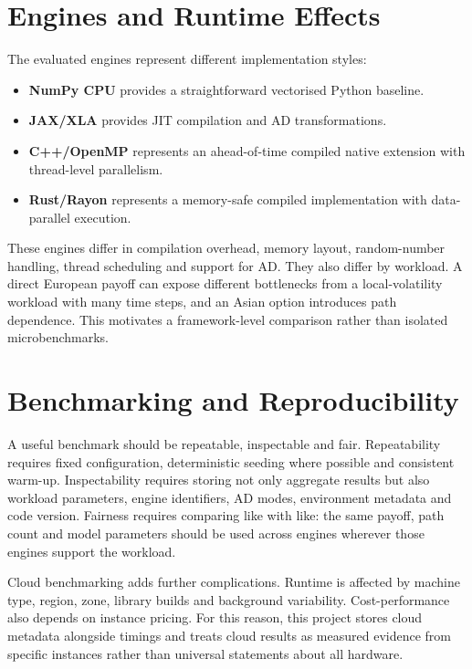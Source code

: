 \section{Engines and Runtime Effects}

The evaluated engines represent different implementation styles:
\begin{itemize}
    \item \textbf{NumPy CPU} provides a straightforward vectorised Python baseline.
    \item \textbf{JAX/XLA} provides JIT compilation and AD transformations.
    \item \textbf{C++/OpenMP} represents an ahead-of-time compiled native extension with thread-level parallelism.
    \item \textbf{Rust/Rayon} represents a memory-safe compiled implementation with data-parallel execution.
\end{itemize}

These engines differ in compilation overhead, memory layout, random-number handling, thread scheduling and support for AD. They also differ by workload. A direct European payoff can expose different bottlenecks from a local-volatility workload with many time steps, and an Asian option introduces path dependence. This motivates a framework-level comparison rather than isolated microbenchmarks.

\section{Benchmarking and Reproducibility}

A useful benchmark should be repeatable, inspectable and fair. Repeatability requires fixed configuration, deterministic seeding where possible and consistent warm-up. Inspectability requires storing not only aggregate results but also workload parameters, engine identifiers, AD modes, environment metadata and code version. Fairness requires comparing like with like: the same payoff, path count and model parameters should be used across engines wherever those engines support the workload.

Cloud benchmarking adds further complications. Runtime is affected by machine type, region, zone, library builds and background variability. Cost-performance also depends on instance pricing. For this reason, this project stores cloud metadata alongside timings and treats cloud results as measured evidence from specific instances rather than universal statements about all hardware.

